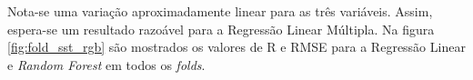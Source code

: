 \begin{figure}[H]
\end{figure}

Nota-se uma variação aproximadamente linear para as três variáveis. Assim, espera-se um resultado razoável para a Regressão Linear Múltipla. Na figura \ref{fig:fold_sst_rgb} são mostrados os valores de R e RMSE para a Regressão Linear e \textit{Random Forest} em todos os \textit{folds}.

